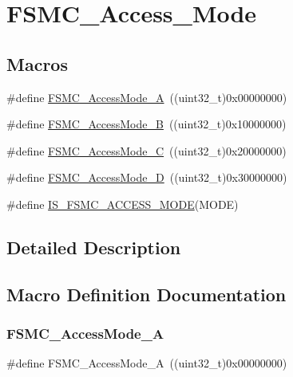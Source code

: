 \hypertarget{group___f_s_m_c___access___mode}{}\section{F\+S\+M\+C\+\_\+\+Access\+\_\+\+Mode}
\label{group___f_s_m_c___access___mode}
\subsection*{Macros}
\begin{DoxyCompactItemize}
\item 
\#define \mbox{\hyperlink{group___f_s_m_c___access___mode_gae0f299b51c12257311694c4a8f5c00c3}{F\+S\+M\+C\+\_\+\+Access\+Mode\+\_\+A}}~((uint32\+\_\+t)0x00000000)
\item 
\#define \mbox{\hyperlink{group___f_s_m_c___access___mode_ga2d6ce7481eb5e0e86fda727c646e4109}{F\+S\+M\+C\+\_\+\+Access\+Mode\+\_\+B}}~((uint32\+\_\+t)0x10000000)
\item 
\#define \mbox{\hyperlink{group___f_s_m_c___access___mode_ga83ffa035cf2e95c957b67a2e8b879e86}{F\+S\+M\+C\+\_\+\+Access\+Mode\+\_\+C}}~((uint32\+\_\+t)0x20000000)
\item 
\#define \mbox{\hyperlink{group___f_s_m_c___access___mode_ga7c632e7ebeb0c0ab4919bb60b8714c7b}{F\+S\+M\+C\+\_\+\+Access\+Mode\+\_\+D}}~((uint32\+\_\+t)0x30000000)
\item 
\#define \mbox{\hyperlink{group___f_s_m_c___access___mode_ga1844335f297ea30e9d7fae09ce562092}{I\+S\+\_\+\+F\+S\+M\+C\+\_\+\+A\+C\+C\+E\+S\+S\+\_\+\+M\+O\+DE}}(M\+O\+DE)
\end{DoxyCompactItemize}


\subsection{Detailed Description}


\subsection{Macro Definition Documentation}
\mbox{\label{group___f_s_m_c___access___mode_gae0f299b51c12257311694c4a8f5c00c3}} 
\subsubsection{\texorpdfstring{FSMC\_AccessMode\_A}{FSMC\_AccessMode\_A}}
{\footnotesize\ttfamily \#define F\+S\+M\+C\+\_\+\+Access\+Mode\+\_\+A~((uint32\+\_\+t)0x00000000)}

